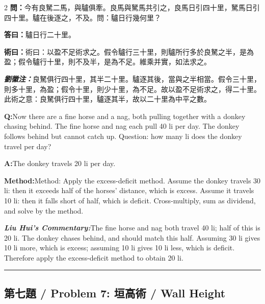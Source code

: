 \documentclass[11pt,a4paper]{article}
\newcommand{\cnwen}{\textcolor{cnlabelfg}{\textbf{問：}}}
\newcommand{\cnda}{\textbf{答曰：}}
\newcommand{\cnshu}{\textcolor{cnlabelfg}{\textbf{術曰：}}}
\newcommand{\cnzhu}{\textcolor{commentarycolor}{\textit{\textbf{劉徽注：}}}}
\newcommand{\enwen}{\textcolor{enlabelfg}{\textbf{Q:}}}
\newcommand{\enda}{\textcolor{enlabelfg}{\textbf{A:}}}
\newcommand{\enshu}{\textcolor{enlabelfg}{\textbf{Method:}}}
\newcommand{\enzhu}{\textcolor{enlabelfg}{\textit{\textbf{Liu Hui's Commentary:}}}}
\begin{document}
\begin{paracol}{2}
\switchcolumn[0]
\cnwen 今有良駑二馬，與驢俱牽。良馬與駑馬共引之，良馬日引四十里，駑馬日引四十里。驢在後逐之，不及。問：驢日行幾何里？

\cnda 驢日行二十里。

\cnshu 術曰：以盈不足術求之。假令驢行三十里，則驢所行多於良駑之半，是為盈；假令驢行十里，則不及半，是為不足。維乘并實，如法求之。

\cnzhu 良駑俱行四十里，其半二十里。驢逐其後，當與之半相當。假令三十里，則多十里，為盈；假令十里，則少十里，為不足。故以盈不足術求之，得二十里。此術之意：良駑俱行四十里，驢逐其半，故以二十里為中平之數。

\switchcolumn[1]
\enwen Now there are a fine horse and a nag, both pulling together with a donkey chasing behind. The fine horse and nag each pull 40 li per day. The donkey follows behind but cannot catch up. Question: how many li does the donkey travel per day?

\enda The donkey travels 20 li per day.

\enshu Method: Apply the excess-deficit method. Assume the donkey travels 30 li: then it exceeds half of the horses' distance, which is excess. Assume it travels 10 li: then it falls short of half, which is deficit. Cross-multiply, sum as dividend, and solve by the method.

\enzhu The fine horse and nag both travel 40 li; half of this is 20 li. The donkey chases behind, and should match this half. Assuming 30 li gives 10 li more, which is excess; assuming 10 li gives 10 li less, which is deficit. Therefore apply the excess-deficit method to obtain 20 li.
\end{paracol}

\bigskip\hrule\bigskip

\subsection{第七題 / Problem 7: 垣高術 / Wall Height}
\end{document}
